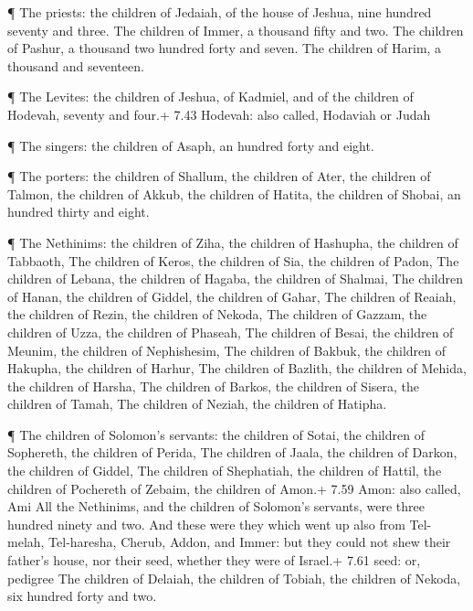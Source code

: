  ¶ The priests: the children of Jedaiah, of the house of
Jeshua, nine hundred seventy and three.  The children of
Immer, a thousand fifty and two.  The children of Pashur, a
thousand two hundred forty and seven.  The children of
Harim, a thousand and seventeen.

 ¶ The Levites: the children of Jeshua, of Kadmiel, and of
the children of Hodevah, seventy and four.+ 7.43 Hodevah: also called,
Hodaviah or Judah

 ¶ The singers: the children of Asaph, an hundred forty and
eight.

 ¶ The porters: the children of Shallum, the children of
Ater, the children of Talmon, the children of Akkub, the children of
Hatita, the children of Shobai, an hundred thirty and eight.

 ¶ The Nethinims: the children of Ziha, the children of
Hashupha, the children of Tabbaoth,  The children of Keros,
the children of Sia, the children of Padon,  The children
of Lebana, the children of Hagaba, the children of Shalmai,
 The children of Hanan, the children of Giddel, the
children of Gahar,  The children of Reaiah, the children of
Rezin, the children of Nekoda,  The children of Gazzam, the
children of Uzza, the children of Phaseah,  The children of
Besai, the children of Meunim, the children of Nephishesim,
 The children of Bakbuk, the children of Hakupha, the
children of Harhur,  The children of Bazlith, the children
of Mehida, the children of Harsha,  The children of Barkos,
the children of Sisera, the children of Tamah,  The
children of Neziah, the children of Hatipha.

 ¶ The children of Solomon's servants: the children of
Sotai, the children of Sophereth, the children of Perida, 
The children of Jaala, the children of Darkon, the children of Giddel,
 The children of Shephatiah, the children of Hattil, the
children of Pochereth of Zebaim, the children of Amon.+ 7.59 Amon: also
called, Ami  All the Nethinims, and the children of
Solomon's servants, were three hundred ninety and two.  And
these were they which went up also from Tel-melah, Tel-haresha, Cherub,
Addon, and Immer: but they could not shew their father's house, nor
their seed, whether they were of Israel.+ 7.61 seed: or, pedigree
 The children of Delaiah, the children of Tobiah, the
children of Nekoda, six hundred forty and two.

